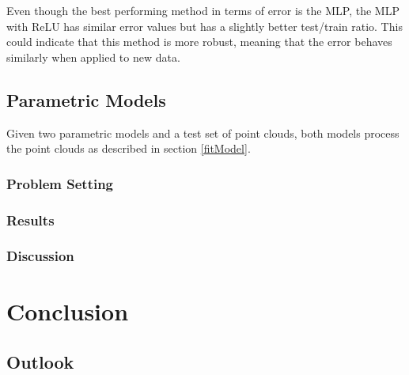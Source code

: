Even though the best performing method in terms of error is the MLP, the MLP with ReLU has similar error values but has a slightly better test/train ratio. This could indicate that this method is more robust, meaning that the error behaves similarly when applied to new data.

\section{Parametric Models}
Given two parametric models and a test set of point clouds, both models process the point clouds as described in section \ref{fitModel}.
\subsection{Problem Setting}
\subsection{Results}
\subsection{Discussion}

\chapter{Conclusion}

\section{Outlook}
